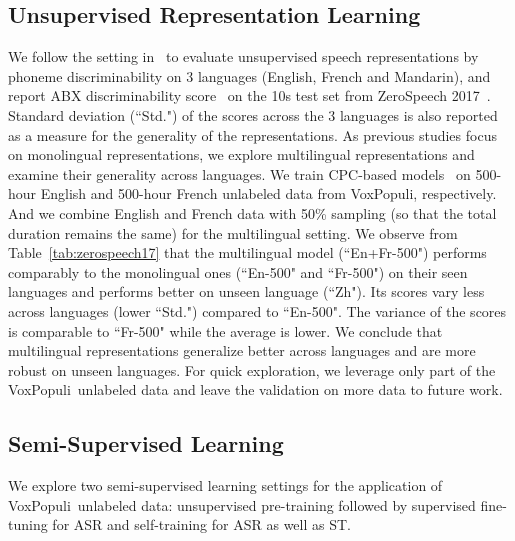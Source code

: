 \documentclass[11pt,a4paper]{article}
\newcommand{\vp}{VoxPopuli}
\begin{document}
\subsection{Unsupervised Representation Learning}
\label{sec:representation_learning}
We follow the setting in~\citet{riviere2020unsupervised} to evaluate unsupervised speech representations by phoneme discriminability on 3 languages (English, French and Mandarin), and report ABX discriminability score~\citep{schatz2013evaluating} on the 10s test set from ZeroSpeech 2017~\citep{dunbar2017zero}. Standard deviation (``Std.") of the scores across the 3 languages is also reported as a measure for the generality of the representations. 
As previous studies focus on monolingual representations, we explore multilingual representations and examine their generality across languages.
We train CPC-based models~\citep{riviere2020unsupervised_wild} on 500-hour English and 500-hour French unlabeled data from \vp, respectively. And we combine English and French data with 50\% sampling (so that the total duration remains the same) for the multilingual setting.
We observe from Table~\ref{tab:zerospeech17} that the multilingual model (``En+Fr-500") performs comparably to the monolingual ones (``En-500" and ``Fr-500") on their seen languages and performs better on unseen language (``Zh"). Its scores vary less across languages (lower ``Std.") compared to ``En-500". The variance of the scores is comparable to ``Fr-500" while the average is lower. We conclude that multilingual representations generalize better across languages and are more robust on unseen languages. For quick exploration, we leverage only part of the \vp~unlabeled data and leave the validation on more data to future work.



\subsection{Semi-Supervised Learning}
We explore two semi-supervised learning settings for the application of \vp~unlabeled data: unsupervised pre-training followed by supervised fine-tuning for ASR and self-training for ASR as well as ST.
\end{document}
